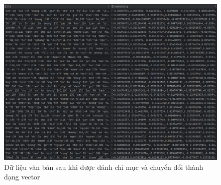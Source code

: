 \begin{figure}[H]
    \centering
    \includegraphics[width=\textwidth]{Images/HybridSearchResult.png}
    \caption{Dữ liệu văn bản sau khi được đánh chỉ mục và chuyển đổi thành dạng vector}
\end{figure}

